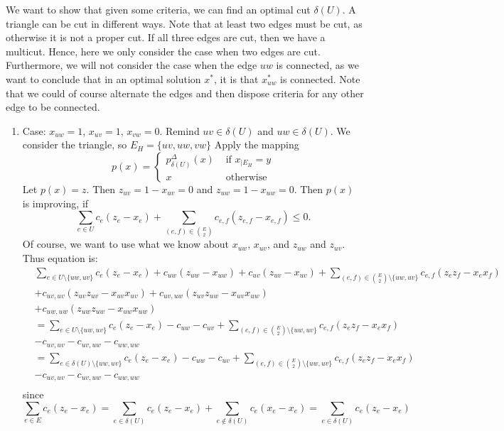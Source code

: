 We want to show that given some criteria, we can find an optimal cut $\delta(U)$. A triangle can be cut in different ways. Note that at least two edges must be cut, as otherwise it is not a proper cut. If all three edges are cut, then we have a multicut. Hence, here we only consider the case when two edges are cut. 
Furthermore, we will not consider the case when the edge $uw$ is connected, as we want to conclude that in an optimal solution $x^*$, it is that $x^*_{uw}$ is connected. 
Note that we could of course alternate the edges and then dispose criteria for any other edge to be connected. 
 \begin{enumerate}
 \item Case: $x_{uw}=1$, $x_{uv}=1$, $x_{vw}=0$. Remind $uv \in \delta(U)$ and $uw \in \delta(U)$. We consider the triangle, so $E_H=\{uv,uw,vw\}$
 Apply the mapping 
 \[ p(x)= \begin{cases}
    p_{\delta(U)}^{\Delta} (x)  & \text{ if } x_{|E_H} =y \\
    x & \text{ otherwise } 
\end{cases} \]
 Let $p(x)=z$. Then $z_{uv}=1-x_{uv}=0$ and $z_{uw}=1-x_{uw}=0$.
 Then $p(x)$ is improving, if 
 \begin{equation}
  \sum_{e \in U} c_e(z_e-x_e) +\sum_{ (e,f) \in {E \choose 2}} c_{e,f}(z_{e,f}-x_{e,f}) \leq 0.
  \end{equation}
 Of course, we want to use what we know about $x_{uw}$, $x_{uv}$, and $z_{uw}$ and $z_{uv}$. 
 Thus equation is: 
 \begin{align*}
 & \sum_{e \in U \setminus \{uw, uv \}} c_e (z_e - x_e) + c_{uw}(z_{uw}-x_{uw}) +c_{uv}(z_{uv}-x_{uv}) + \sum_{ (e,f) \in {E \choose 2} \setminus \{uw,uv\} } c_{e,f} (z_e z_f - x_e x_f) \\
 & + c_{uv,uv}(z_{uv} z_{uv} - x_{uv}x_{uv}) + c_{uv,uw}(z_{uv} z_{uw} - x_{uv}x_{uw}) \\
 & +c_{uw,uw}(z_{uw} z_{uw} - x_{uw}x_{uw} )\\
 &= \sum_{e \in U \setminus \{uw, uv \}} c_e (z_e - x_e) - c_{uw} -c_{uv} + \sum_{ (e,f) \in {E \choose 2} \setminus \{uw,uv\} } c_{e,f} (z_e z_f - x_e x_f) \\
 & - c_{uv,uv} - c_{uv,uw}-c_{uw,uw}\\
 &= \sum_{e \in \delta(U) \setminus \{uw, uv \}} c_e (z_e - x_e) - c_{uw} -c_{uv} + \sum_{ (e,f) \in {E \choose 2} \setminus \{uw,uv\} } c_{e,f} (z_e z_f - x_e x_f) \\
 & - c_{uv,uv} - c_{uv,uw}-c_{uw,uw}\\
\end{align*}
since \[ \sum_{e \in E} c_e(z_e-x_e) = \sum_{e \in \delta(U)} c_e(z_e-x_e) + \sum_{e \notin \delta(U)} c_e (x_e-x_e)= \sum_{e \in \delta(U)} c_e (z_e-x_e) \] 


\end{enumerate}
